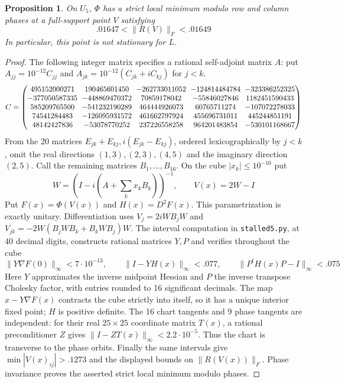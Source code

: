 \documentclass[11pt,a4paper]{article}
\newtheorem{prop}[thm]{Proposition}
\begin{document}
\begin{prop}\label{residualminimum}
On $U_5$, $\Phi$ has a strict local minimum modulo row and column phases
at a full-support point $V$ satisfying
\[
 .01647<\|R(V)\|_F<.01649
\]
In particular, this point is not stationary for $L$.
\end{prop}
\begin{proof}
The following integer matrix specifies a rational self-adjoint matrix $A$:
put $A_{jj}=10^{-12}C_{jj}$ and
$A_{jk}=10^{-12}(C_{jk}+iC_{kj})$ for $j<k$.
\[
\setlength{\arraycolsep}{3pt}
C=\begin{pmatrix}
495152000271&190465601450&-262733011052&-124814484784&-323386252325\\
-377050587335&-448869470372&70859178042&-55846027846&1182451590433\\
585209765500&-541232190289&464444926073&60765711274&-107072278033\\
74541284483&-126095931572&461662797924&455696731011&445244851191\\
48142427836&-53078770252&237226558258&964201483854&-530101168667
\end{pmatrix}
\]
From the 20 matrices $E_{jk}+E_{kj},i(E_{jk}-E_{kj})$, ordered
lexicographically by $j<k$, omit the real directions $(1,3),(2,3),(4,5)$
and the imaginary direction $(2,5)$. Call the remaining matrices
$B_1,\ldots,B_{16}$. On the cube $|x_k|\le10^{-10}$ put
\[
 W=(I-i(A+\sum_k x_kB_k))^{-1},\qquad V(x)=2W-I
\]
Put $F(x)=\Phi(V(x))$ and $H(x)=D^2F(x)$.
This parametrization is exactly unitary. Differentiation uses
$V_j=2iWB_jW$ and
$V_{jk}=-2W(B_jWB_k+B_kWB_j)W$.
The interval computation in \texttt{stalled5.py}, at $40$ decimal digits,
constructs rational matrices $Y,P$ and verifies throughout the cube
\[
 \|Y\nabla F(0)\|_\infty<7\cdot10^{-13},\qquad
 \|I-YH(x)\|_\infty<.077,\qquad
 \|P^tH(x)P-I\|_\infty<.075
\]
Here $Y$ approximates the inverse midpoint Hessian and $P$ the inverse
transpose Cholesky factor, with entries rounded to 16 significant
decimals. The map $x-Y\nabla F(x)$ contracts the cube strictly into
itself, so it has a unique interior fixed point; $H$ is positive definite.
The 16 chart tangents and 9 phase tangents are independent:
for their real $25\times25$ coordinate matrix $T(x)$, a rational
preconditioner $Z$ gives $\|I-ZT(x)\|_\infty<2.2\cdot10^{-5}$.
Thus the chart is transverse to the phase orbits. Finally the same
intervals give $\min|V(x)_{ij}|>.1273$ and the displayed bounds on
$\|R(V(x))\|_F$. Phase invariance proves the asserted strict local
minimum modulo phases.
\end{proof}
\end{document}
